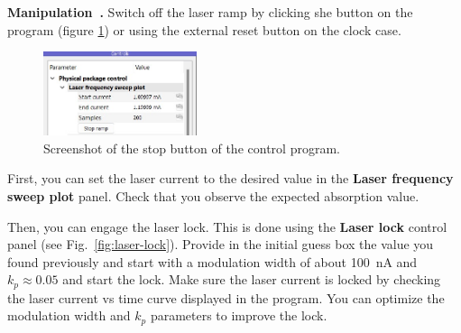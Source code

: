 \documentclass[a4paper,11pt]{article}
\newcounter{manip}
\newenvironment{manip}[1][]{\refstepcounter{manip}\par\medskip
	\textbf{Manipulation~\themanip. #1} \rmfamily }{\medskip}
\begin{document}
\begin{manip}
Switch off the laser ramp by clicking she  button on the program (figure \ref{fig:stopbutton}) or using the external reset button on the clock case.

\begin{figure}[!h] %
\centering
\includegraphics[width=0.4\textwidth]{Images/stop_button.jpg}
\captionsetup{justification=centering}
\caption{Screenshot of the stop button of the control program.}
\label{fig:stopbutton}
\end{figure}

First, you can set the laser current to the desired value in the \textbf{\textsf{Laser frequency sweep plot}} panel. Check that you observe the expected absorption value. 

Then, you can engage the laser lock. This is done using the \textbf{\textsf{Laser lock}} control panel (see Fig.~\ref{fig:laser-lock}). Provide in the \textsf{initial guess} box the value you found previously and start with a modulation width of about 100~nA and $k_p \approx 0.05$ and start the lock. Make sure the laser current is locked by checking the laser current vs time curve displayed in the program. You can optimize the modulation width and $k_p$ parameters to improve the lock.







\end{manip}
\end{document}
